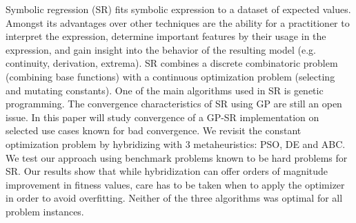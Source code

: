 Symbolic regression (SR) fits symbolic expression to a dataset of expected values. Amongst its advantages over other techniques are the ability for a practitioner to interpret the expression, determine important features by their usage in the expression, and gain insight into the behavior of the resulting model (e.g. continuity, derivation, extrema). SR combines a discrete combinatoric problem (combining base functions) with a continuous optimization problem (selecting and mutating constants). One of the main algorithms used in SR is genetic programming. The convergence characteristics of SR using GP are still an open issue. In this paper will study convergence of a GP-SR implementation on selected use cases known for bad convergence. We revisit the constant optimization problem by hybridizing with 3 metaheuristics: PSO, DE and ABC. We test our approach using benchmark problems known to be hard problems for SR.
Our results show that while hybridization can offer orders of magnitude improvement in fitness values, care has to be taken when to apply the optimizer in order to avoid overfitting. Neither of the three algorithms was optimal for all problem instances.